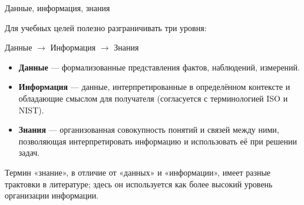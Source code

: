 \documentclass[aspectratio=169]{beamer}
\begin{document}
\begin{frame}{Данные, информация, знания}

Для учебных целей полезно разграничивать три уровня:

\vspace{0.3cm}

\begin{center}
\Large
Данные $\rightarrow$ Информация $\rightarrow$ Знания
\end{center}

\vspace{0.4cm}

\begin{itemize}
  \item \textbf{Данные} — формализованные представления
        фактов, наблюдений, измерений.
  \item \textbf{Информация} — данные, интерпретированные
        в определённом контексте и обладающие смыслом
        для получателя (согласуется с терминологией ISO и NIST).
  \item \textbf{Знания} — организованная совокупность понятий
        и связей между ними, позволяющая интерпретировать
        информацию и использовать её при решении задач.
\end{itemize}

\vspace{0.2cm}
\footnotesize
Термин «знание», в отличие от «данных» и «информации»,
имеет разные трактовки в литературе; здесь он используется
как более высокий уровень организации информации.

\end{frame}
\end{document}
